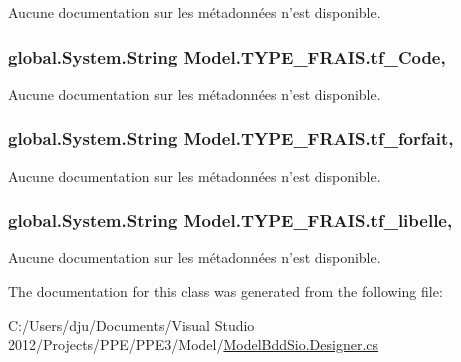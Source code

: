 Aucune documentation sur les métadonnées n'est disponible. 

\hypertarget{class_model_1_1_t_y_p_e___f_r_a_i_s_ac8c5a8aeabcb4b38a50db20d886ecb9e}{
\subsubsection[{tf\-\_\-\-Code}]{\setlength{\rightskip}{0pt plus 5cm}global.\-System.\-String Model.\-T\-Y\-P\-E\-\_\-\-F\-R\-A\-I\-S.\-tf\-\_\-\-Code\hspace{0.3cm}{\ttfamily [get]}, {\ttfamily [set]}}}\label{class_model_1_1_t_y_p_e___f_r_a_i_s_ac8c5a8aeabcb4b38a50db20d886ecb9e}


Aucune documentation sur les métadonnées n'est disponible. 

\hypertarget{class_model_1_1_t_y_p_e___f_r_a_i_s_a6ae5651634f9c6cea6689957657159fb}{
\subsubsection[{tf\-\_\-forfait}]{\setlength{\rightskip}{0pt plus 5cm}global.\-System.\-String Model.\-T\-Y\-P\-E\-\_\-\-F\-R\-A\-I\-S.\-tf\-\_\-forfait\hspace{0.3cm}{\ttfamily [get]}, {\ttfamily [set]}}}\label{class_model_1_1_t_y_p_e___f_r_a_i_s_a6ae5651634f9c6cea6689957657159fb}


Aucune documentation sur les métadonnées n'est disponible. 

\hypertarget{class_model_1_1_t_y_p_e___f_r_a_i_s_af00f4a0d82dbf74a04003222679a055a}{
\subsubsection[{tf\-\_\-libelle}]{\setlength{\rightskip}{0pt plus 5cm}global.\-System.\-String Model.\-T\-Y\-P\-E\-\_\-\-F\-R\-A\-I\-S.\-tf\-\_\-libelle\hspace{0.3cm}{\ttfamily [get]}, {\ttfamily [set]}}}\label{class_model_1_1_t_y_p_e___f_r_a_i_s_af00f4a0d82dbf74a04003222679a055a}


Aucune documentation sur les métadonnées n'est disponible. 



The documentation for this class was generated from the following file\-:\begin{DoxyCompactItemize}
\item 
C\-:/\-Users/dju/\-Documents/\-Visual Studio 2012/\-Projects/\-P\-P\-E/\-P\-P\-E3/\-Model/\hyperlink{_model_bdd_sio_8_designer_8cs}{Model\-Bdd\-Sio.\-Designer.\-cs}\end{DoxyCompactItemize}
